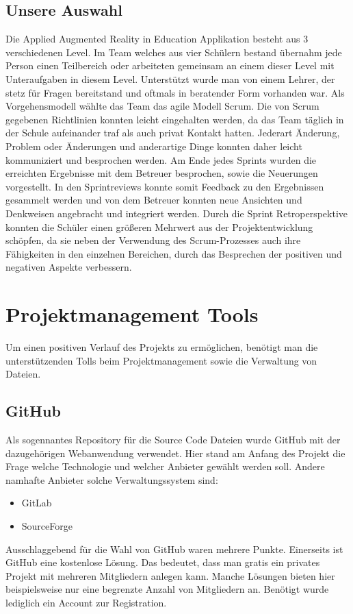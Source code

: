\subsection{Unsere Auswahl}
Die Applied Augmented Reality in Education Applikation besteht aus 3 verschiedenen Level.
Im Team welches aus vier Schülern bestand übernahm jede Person einen Teilbereich oder arbeiteten
gemeinsam an einem dieser Level mit Unteraufgaben in diesem Level. Unterstützt wurde man von einem
Lehrer, der stetz für Fragen bereitstand und oftmals in beratender Form vorhanden war. Als
Vorgehensmodell wählte das Team das agile Modell Scrum. Die von Scrum gegebenen Richtlinien
konnten leicht eingehalten werden, da das Team täglich in der Schule aufeinander
traf als auch privat Kontakt hatten. Jederart Änderung, Problem oder Änderungen und anderartige
Dinge konnten daher leicht kommuniziert und besprochen werden. Am Ende jedes Sprints wurden
die erreichten Ergebnisse mit dem Betreuer besprochen, sowie die Neuerungen vorgestellt.
In den Sprintreviews konnte somit Feedback zu den Ergebnissen gesammelt werden und von dem
Betreuer konnten neue Ansichten und Denkweisen angebracht und integriert werden.
Durch die Sprint Retroperspektive konnten die Schüler einen größeren Mehrwert aus der
Projektentwicklung schöpfen, da sie neben der Verwendung des Scrum-Prozesses auch ihre Fähigkeiten
in den einzelnen Bereichen, durch das Besprechen der positiven und negativen Aspekte verbessern.

\section{Projektmanagement Tools}
Um einen positiven Verlauf des Projekts zu ermöglichen, benötigt man die unterstützenden
Tolls beim Projektmanagement sowie die Verwaltung von Dateien.

\subsection{GitHub}
Als sogennantes Repository für die Source Code Dateien wurde GitHub mit der dazugehörigen
Webanwendung verwendet. Hier stand am Anfang des Projekt die Frage welche Technologie und
welcher Anbieter gewählt werden soll. Andere namhafte Anbieter solche Verwaltungssystem sind:
\begin{itemize}
    \item GitLab
    \item SourceForge
\end{itemize}
Ausschlaggebend für die Wahl von GitHub waren mehrere Punkte. Einerseits ist GitHub eine
kostenlose Lösung. Das bedeutet, dass man gratis ein privates Projekt mit mehreren Mitgliedern
anlegen kann. Manche Lösungen bieten hier beispielsweise nur eine begrenzte Anzahl von
Mitgliedern an. Benötigt wurde lediglich ein Account zur Registration.

